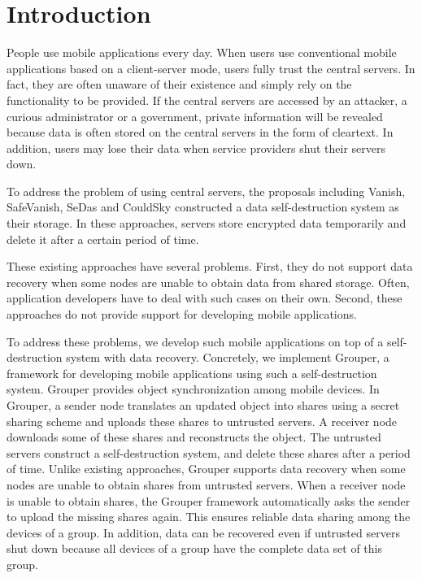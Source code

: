 \documentclass[a4paper,11pt]{report}
\begin{document}
\pagebreak \setcounter{page}{1}

\chapter{Introduction} \label{chapter:introduction}

People use mobile applications every day. 
When users use conventional mobile applications based on a client-server mode, users fully trust the central servers.
In fact, they are often unaware of their existence and simply rely on the functionality to be provided.
If the central servers are accessed by an attacker, a curious administrator or a government, private information will be revealed because data is often stored on the central servers in the form of cleartext.
In addition, users may lose their data when service providers shut their servers down.

To address the problem of using central servers, the proposals including Vanish\cite{geambasu2009vanish}, SafeVanish\cite{zeng2010safevanish}, SeDas\cite{zeng2012sedas} and CouldSky\cite{zeng2015cloudsky} constructed a data self-destruction system as their storage.
In these approaches, servers store encrypted data temporarily and delete it after a certain period of time.

These existing approaches have several problems.
First, they do not support data recovery when some nodes are unable to obtain data from shared storage.
Often, application developers have to deal with such cases on their own.
Second, these approaches do not provide support for developing mobile applications.

To address these problems, we develop such mobile applications on top of a self-destruction system with data recovery.
Concretely, we implement Grouper, a framework for developing mobile applications using such a self-destruction system\cite{li2017grouper}. 
Grouper provides object synchronization among mobile devices.
In Grouper, a sender node translates an updated object into shares using a secret sharing scheme and uploads these shares to untrusted servers. 
A receiver node downloads some of these shares and reconstructs the object.
The untrusted servers construct a self-destruction system, and delete these shares after a period of time.
Unlike existing approaches, Grouper supports data recovery when some nodes are unable to obtain shares from untrusted servers.
When a receiver node is unable to obtain shares, the Grouper framework automatically asks the sender to upload the missing shares again.
This ensures reliable data sharing among the devices of a group.
In addition, data can be recovered even if untrusted servers shut down because all devices of a group have the complete data set of this group.
\end{document}
